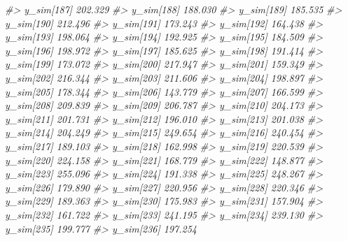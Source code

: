 \documentclass[
  10pt,
  italian,
  a4paper,
  extrafontsizes,onecolumn,openright
  ]{memoir}
\newenvironment{Shaded}{\begin{snugshade}}{\end{snugshade}}
\newcommand{\CommentTok}[1]{\textcolor[rgb]{0.56,0.35,0.01}{\textit{#1}}}
\begin{document}
\begin{Shaded}
\begin{Highlighting}[]
\CommentTok{\#\textgreater{}   y\_sim[187] 202.329}
\CommentTok{\#\textgreater{}   y\_sim[188] 188.030}
\CommentTok{\#\textgreater{}   y\_sim[189] 185.535}
\CommentTok{\#\textgreater{}   y\_sim[190] 212.496}
\CommentTok{\#\textgreater{}   y\_sim[191] 173.243}
\CommentTok{\#\textgreater{}   y\_sim[192] 164.438}
\CommentTok{\#\textgreater{}   y\_sim[193] 198.064}
\CommentTok{\#\textgreater{}   y\_sim[194] 192.925}
\CommentTok{\#\textgreater{}   y\_sim[195] 184.509}
\CommentTok{\#\textgreater{}   y\_sim[196] 198.972}
\CommentTok{\#\textgreater{}   y\_sim[197] 185.625}
\CommentTok{\#\textgreater{}   y\_sim[198] 191.414}
\CommentTok{\#\textgreater{}   y\_sim[199] 173.072}
\CommentTok{\#\textgreater{}   y\_sim[200] 217.947}
\CommentTok{\#\textgreater{}   y\_sim[201] 159.349}
\CommentTok{\#\textgreater{}   y\_sim[202] 216.344}
\CommentTok{\#\textgreater{}   y\_sim[203] 211.606}
\CommentTok{\#\textgreater{}   y\_sim[204] 198.897}
\CommentTok{\#\textgreater{}   y\_sim[205] 178.344}
\CommentTok{\#\textgreater{}   y\_sim[206] 143.779}
\CommentTok{\#\textgreater{}   y\_sim[207] 166.599}
\CommentTok{\#\textgreater{}   y\_sim[208] 209.839}
\CommentTok{\#\textgreater{}   y\_sim[209] 206.787}
\CommentTok{\#\textgreater{}   y\_sim[210] 204.173}
\CommentTok{\#\textgreater{}   y\_sim[211] 201.731}
\CommentTok{\#\textgreater{}   y\_sim[212] 196.010}
\CommentTok{\#\textgreater{}   y\_sim[213] 201.038}
\CommentTok{\#\textgreater{}   y\_sim[214] 204.249}
\CommentTok{\#\textgreater{}   y\_sim[215] 249.654}
\CommentTok{\#\textgreater{}   y\_sim[216] 240.454}
\CommentTok{\#\textgreater{}   y\_sim[217] 189.103}
\CommentTok{\#\textgreater{}   y\_sim[218] 162.998}
\CommentTok{\#\textgreater{}   y\_sim[219] 220.539}
\CommentTok{\#\textgreater{}   y\_sim[220] 224.158}
\CommentTok{\#\textgreater{}   y\_sim[221] 168.779}
\CommentTok{\#\textgreater{}   y\_sim[222] 148.877}
\CommentTok{\#\textgreater{}   y\_sim[223] 255.096}
\CommentTok{\#\textgreater{}   y\_sim[224] 191.338}
\CommentTok{\#\textgreater{}   y\_sim[225] 248.267}
\CommentTok{\#\textgreater{}   y\_sim[226] 179.890}
\CommentTok{\#\textgreater{}   y\_sim[227] 220.956}
\CommentTok{\#\textgreater{}   y\_sim[228] 220.346}
\CommentTok{\#\textgreater{}   y\_sim[229] 189.363}
\CommentTok{\#\textgreater{}   y\_sim[230] 175.983}
\CommentTok{\#\textgreater{}   y\_sim[231] 157.904}
\CommentTok{\#\textgreater{}   y\_sim[232] 161.722}
\CommentTok{\#\textgreater{}   y\_sim[233] 241.195}
\CommentTok{\#\textgreater{}   y\_sim[234] 239.130}
\CommentTok{\#\textgreater{}   y\_sim[235] 199.777}
\CommentTok{\#\textgreater{}   y\_sim[236] 197.254}

\end{Highlighting}
\end{Shaded}
\end{document}
